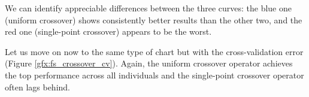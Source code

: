 	We can identify appreciable differences between the three curves: the blue one (uniform crossover) shows consistently better results than the other two, and the red one (single-point crossover) appears to be the worst.

\newpage

	Let us move on now to the same type of chart but with the cross-validation error (Figure \ref{gfx:fs_crossover_cv}). Again, the uniform crossover operator achieves the top performance across all individuals and the single-point crossover operator often lags behind.

	\begin{figure}[h]

        \begin{center}

        	\setlength{\fboxrule}{0pt}


\end{center}
\end{figure}
